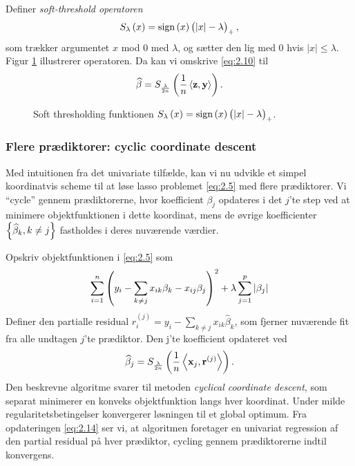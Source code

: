 Definer \textit{soft-threshold operatoren}
\begin{align*}
S_\lambda\del{x}=\text{sign}\del{x} \del{\vert x \vert - \lambda}_+,
\end{align*}
som trækker argumentet $x$ mod 0 med $\lambda$, og sætter den lig med 0 hvis $\vert x \vert \leq \lambda$. 
Figur \ref{fig:soft_thresholding_fct} illustrerer operatoren.
Da kan vi omskrive \eqref{eq:2.10} til
\begin{align*}
\widehat{\beta} = S_{\frac{\lambda}{2n}} \del{\frac{1}{n} \left\langle \mathbf{z}, \mathbf{y} \right\rangle}.
\end{align*}
%
\begin{figure}[H]
\centering
\scalebox{0.8}{}
\caption[optional short text]{Soft thresholding funktionen $S_\lambda\del{x}=\text{sign}\del{x} \del{\vert x \vert - \lambda}_+$.} \label{fig:soft_thresholding_fct}
\end{figure}
%
\subsubsection{Flere prædiktorer: cyclic coordinate descent}
Med intuitionen  fra det univariate tilfælde, kan vi nu udvikle et simpel koordinatvis scheme til at løse lasso problemet \eqref{eq:2.5} med flere prædiktorer.
Vi ``cycle'' gennem prædiktorerne, hvor koefficient \(\beta_j\) opdateres i det \(j\)'te step ved at minimere objektfunktionen i dette koordinat, mens de øvrige koefficienter $\cbr{\widehat{\beta}_k, k \neq j}$ fastholdes i deres nuværende værdier. 


Opskriv objektfunktionen i \eqref{eq:2.5} som
\begin{align*}
\sum_{i=1}^n \del{y_i - \sum_{k \neq j} x_{ik} \beta_k - x_{ij} \beta_j}^2 + \lambda \sum_{j = 1}^p \vert \beta_j \vert
\end{align*}
Definer den partialle residual $r_i^{(j)}=y_i - \sum_{k \neq j} x_{ik} \widehat{\beta}_k$, som fjerner nuværende fit fra alle undtagen $j$'te prædiktor.
Den j'te koefficient opdateret ved
\begin{align}
\widehat{\beta}_j = S_{\frac{\lambda}{2n}} \del{\frac{1}{n} \left\langle \mathbf{x}_j, \mathbf{r}^{(j)} \right\rangle}. \label{eq:2.14}
\end{align}
Den beskrevne algoritme svarer til metoden \textit{cyclical coordinate descent}, som separat minimerer en konveks objektfunktion langs hver koordinat.
Under milde regularitetsbetingelser konvergerer løsningen til et global optimum.
Fra opdateringen \eqref{eq:2.14} ser vi, at algoritmen foretager en univariat regression af den partial residual på hver prædiktor, cycling gennem prædiktorerne indtil konvergens.

